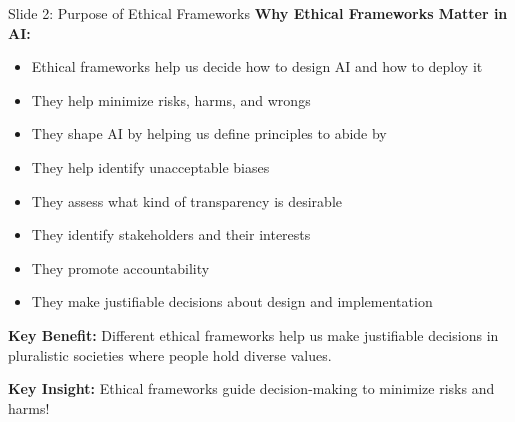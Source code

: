 \documentclass[8pt]{beamer}
\begin{document}
	\begin{frame}{Slide 2: Purpose of Ethical Frameworks}
		\fontsize{6.5}{7.5}\selectfont
		\textbf{Why Ethical Frameworks Matter in AI:}
		\begin{itemize}
			\item Ethical frameworks help us decide how to design AI and how to deploy it
			\item They help minimize risks, harms, and wrongs
			\item They shape AI by helping us define principles to abide by
			\item They help identify unacceptable biases
			\item They assess what kind of transparency is desirable
			\item They identify stakeholders and their interests
			\item They promote accountability
			\item They make justifiable decisions about design and implementation
		\end{itemize}
		
		\vspace{0.1cm}
		\textbf{Key Benefit:}
		Different ethical frameworks help us make justifiable decisions in pluralistic societies where people hold diverse values.
		
		\textcolor{myblue}{\textbf{Key Insight:}} Ethical frameworks \textcolor{myblue}{guide decision-making} to minimize risks and harms!
	\end{frame}
	
\end{document}
